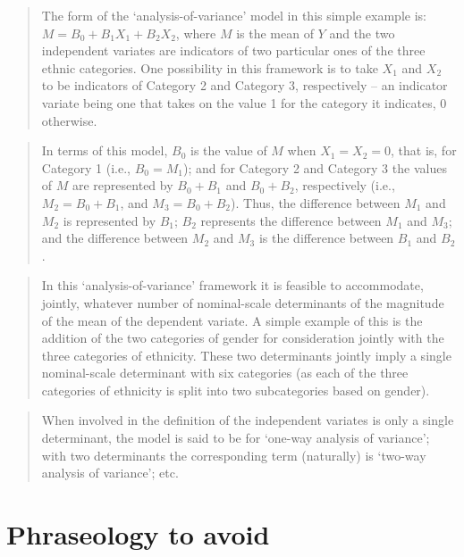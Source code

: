 \documentclass[]{book}
\begin{document}
\begin{quote}
The form of the `analysis-of-variance' model in this simple example is: \(M = B_0 + B_1 X_1 + B_2 X_2\),
where \(M\) is the mean of \(Y\) and the two independent variates are indicators of two particular ones of the three ethnic categories. One possibility in this framework is to take \(X_1\) and \(X_2\) to be indicators of Category 2 and Category 3, respectively -- an indicator variate being one that takes on the value 1 for the category it indicates, 0 otherwise.
\end{quote}

\begin{quote}
In terms of this model, \(B_0\) is the value of \(M\) when \(X_1 = X_2 = 0\), that is, for Category 1 (i.e., \(B_0 = M_1\)); and for Category 2 and Category 3 the values of \(M\) are represented by \(B_0 + B_1\) and \(B_0 + B_2\), respectively (i.e., \(M_2 = B_0 + B_1\), and \(M_3 = B_0 + B_2\)). Thus, the difference between \(M_1\) and \(M_2\) is represented by \(B_1\); \(B_2\) represents the difference between \(M_1\) and \(M_3\); and the difference between \(M_2\) and \(M_3\) is the difference between \(B_1\) and \(B_2\).
\end{quote}

\begin{quote}
In this `analysis-of-variance' framework it is feasible to accommodate, jointly, whatever number of nominal-scale determinants of the magnitude of the mean of the dependent variate. A simple example of this is the addition of the two categories of gender for consideration jointly with the three categories of ethnicity. These two determinants jointly imply a single nominal-scale determinant with six categories (as each of the three categories of ethnicity is split into two subcategories based on gender).
\end{quote}

\begin{quote}
When involved in the definition of the independent variates is only a single determinant, the model is said to be for `one-way analysis of variance'; with two determinants the corresponding term (naturally) is `two-way analysis of variance'; etc.
\end{quote}

\hypertarget{phraseology-to-avoid}{%
\section{Phraseology to avoid}\label{phraseology-to-avoid}}
\end{document}

